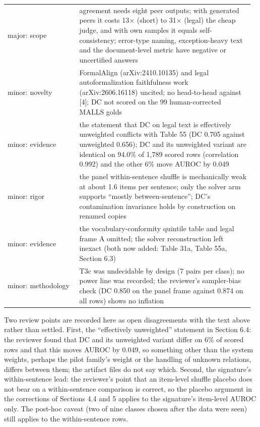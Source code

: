 \documentclass[11pt,letterpaper]{article}
\begin{document}
{\begin{longtable}{>{\raggedright\arraybackslash}p{0.281\linewidth}>{\raggedright\arraybackslash}p{0.684\linewidth}}
{}major: scope & agreement needs eight peer outputs; with generated peers it costs 13$\times$ (short) to 31$\times$ (legal) the cheap judge, and with own samples it equals self-consistency; error-type naming, exception-heavy text and the document-level metric have negative or uncertified answers \\
{}minor: novelty & FormalAlign (arXiv:2410.10135) and legal autoformalization faithfulness work (arXiv:2606.16118) uncited; no head-to-head against [4]; DC not scored on the 99 human-corrected MALLS golds \\
{}minor: evidence & the statement that DC on legal text is effectively unweighted conflicts with Table 55 (DC 0.705 against unweighted 0.656); DC and its unweighted variant are identical on 94.0\% of 1,789 scored rows (correlation 0.992) and the other 6\% move AUROC by 0.049 \\
{}minor: rigor & the panel within-sentence shuffle is mechanically weak at about 1.6 items per sentence; only the solver arm supports ``mostly between-sentence''; DC's contamination invariance holds by construction on renamed copies \\
{}minor: evidence & the vocabulary-conformity quintile table and legal frame A omitted; the solver reconstruction left inexact (both now added: Table 31a, Table 55a, Section 6.3) \\
{}minor: methodology & T3c was undecidable by design (7 pairs per class); no power line was recorded; the reviewer's sampler-bias check (DC 0.850 on the panel frame against 0.874 on all rows) shows no inflation \\
\end{longtable}
}

Two review points are recorded here as open disagreements with the text above rather than settled. First, the ``effectively unweighted'' statement in Section 6.4: the reviewer found that DC and its unweighted variant differ on 6\% of scored rows and that this moves AUROC by 0.049, so something other than the system weights, perhaps the pilot family's weight or the handling of unknown relations, differs between them; the artifact files do not say which. Second, the signature's within-sentence lead: the reviewer's point that an item-level shuffle placebo does not bear on a within-sentence comparison is correct, so the placebo argument in the corrections of Sections 4.4 and 5 applies to the signature's item-level AUROC only. The post-hoc caveat (two of nine classes chosen after the data were seen) still applies to the within-sentence rows.
\end{document}
